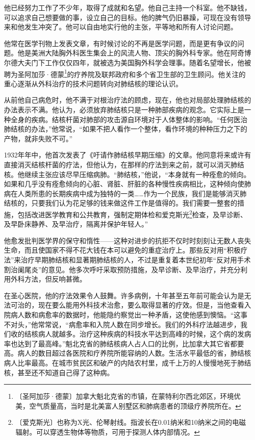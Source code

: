 \documentclass[12pt,UTF-8,openany]{ctexbook}
\begin{document}
\begin{normalsize}
    
    他已经努力工作了不少年，取得了成就和名望。他自己主持一个科室。他不缺钱，可以追求自己想要做的事，设立自己的目标。他的脾气仍旧暴躁，可现在没有领导来和他发生冲突了。他可以自由地实行他的主张，平等地和所有人讨论问题。
    
    他常在医学刊物上发表文章，有时候讨论的不再是医学问题，而是更有争议的问题。他是美洲大陆胸外科医生集会上的风流人物、顶尖的胸外科专家。他在阿奇博尔德大夫门下工作仅仅四年，就被选为美国胸外科学会理事。随着名望增长，他被聘为圣阿加莎·德蒙\footnote{〔圣阿加莎·德蒙〕加拿大魁北克省的市镇，在蒙特利尔西北郊区，环境优美，空气质量高，当时是北美富人别墅区和肺病患者的顶级疗养院所在。}的疗养院及联邦政府和多个省卫生部的卫生顾问。他关注的重心逐渐从外科治疗的技术问题转向对肺结核的理论认识。
    
    从前他自己病危时，他不满于对根治疗法的顾虑，现在，他也对局部处理肺结核的办法表示不满。他认为，必须放弃肺结核只是一种肺部疾病的观念。它实际上是一种全身的疾病。结核杆菌对肺部的攻击源自环境对于人体整体的影响。“任何医治肺结核的办法，”他常说，“如果不把人看作一个整体，看作环境的种种压力之下的产物，就非失败不可。”
    
    1932年年中，他首次发表了《吁请作肺结核早期压缩》的文章。他同意将来或许有直接消灭结核杆菌的疗法，但他认为，在那样的疗法到来之前，就可以消灭肺结核。他继续主张应该尽早压缩病肺。“肺结核，”他说，“本身就有一种痊愈的倾向。如果和几乎没有痊愈倾向的心脏、肾脏、肝脏的各种慢性疾病相比，这种倾向使肺病在人类所患的长期疾病中成为独特的一类……作为一个民族，我们是能够消灭肺结核的，只要我们认为花足够的钱来做这件工作是值得的。我们需要一整套的措施，包括改进医学教育和公共教育，强制定期体检和爱克斯光\footnote{〔爱克斯光〕也称为X光、伦琴射线。指波长在0.01纳米和10纳米之间的电磁辐射。可以穿透生物体等物质，可用于探测人体内部情况。}检查，及早诊断、及早卧床静养、及早治疗，隔离并保护年轻人。”
    
    他愈发批判医学界的保守和惰性——这种对进步的抗拒不仅时时刻刻让无数人丧失生命，而且使国家不得不花大钱在本可以避免的重症治疗上。那些反对用“积极疗法”来治疗早期肺结核和显著期肺结核的人，不过是重复着本世纪初年“反对用手术割治阑尾炎”的意见。他多次呼吁采取预防措施，及早诊断、及早治疗，并充分利用外科方法，但反响甚微。
    
    在圣心医院，他的疗法效果令人鼓舞。许多病例，十年甚至五年前可能会认为是无法可治的，现在要么能用外科技术治愈，要么取得显著的疗效。但是，当他查看入院病人数和病愈率的数据时，他能隐约察觉出一种矛盾，这使他感到懊恼。“这事不对头，”他常常说，“病愈率和入院人数在同步增长。我们的外科疗法越进步，我们收的结核病人就越多。治疗这种疾病的科技水平达到高峰的时候，这个病的发病率也达到了最高峰。”魁北克省的肺结核病人占人口的比例，比加拿大其它省都要高。病人的数目超过各医院和疗养院所能容纳的人数。生活水平最低的省，肺结核病人比率最高。在城市贫民区和破产的内陆农村里，成千上万的人慢慢地死于肺结核，甚至还不知道自己得了这种病。
    

\end{normalsize}
\end{document}
